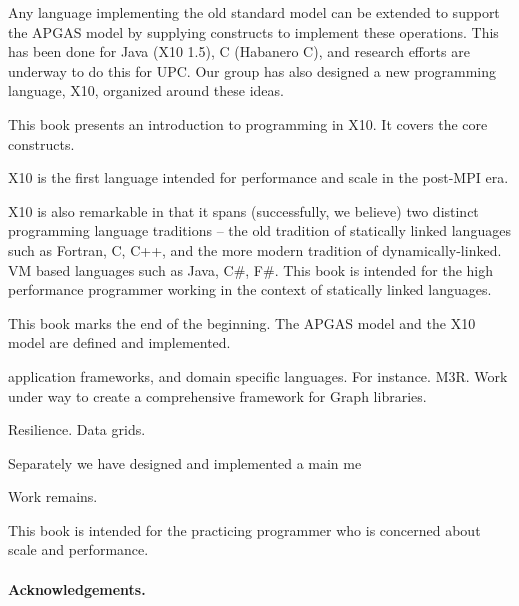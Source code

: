 Any language implementing the old standard model can be extended to
support the APGAS model by supplying constructs to implement these
operations. This has been done for Java (X10 1.5), C (Habanero C), and
research efforts are underway to do this for UPC. Our group has also
designed a new programming language, X10, organized around these
ideas. 

This book presents an introduction to programming in X10.  It covers
the core constructs. 

X10 is the first language intended for performance and scale in the
post-MPI era.  

X10 is also remarkable in that it spans (successfully, we believe) two
distinct programming language traditions -- the old tradition of
statically linked languages such as Fortran, C, C++, and the more
modern tradition of dynamically-linked. VM based languages such as
Java, C\#, F\#.   This book is intended for the high performance
programmer working in the context of statically linked languages.

This book marks the end of the beginning. The APGAS model and the X10
model are defined and implemented. 

application frameworks, and domain specific languages.  For
instance. M3R. Work under way to create a comprehensive framework for
Graph libraries.

Resilience.
Data grids.

Separately we have designed and implemented a main me

Work remains. 

This book is intended for the practicing programmer who is concerned
about scale and performance.   

\paragraph{Acknowledgements.}
